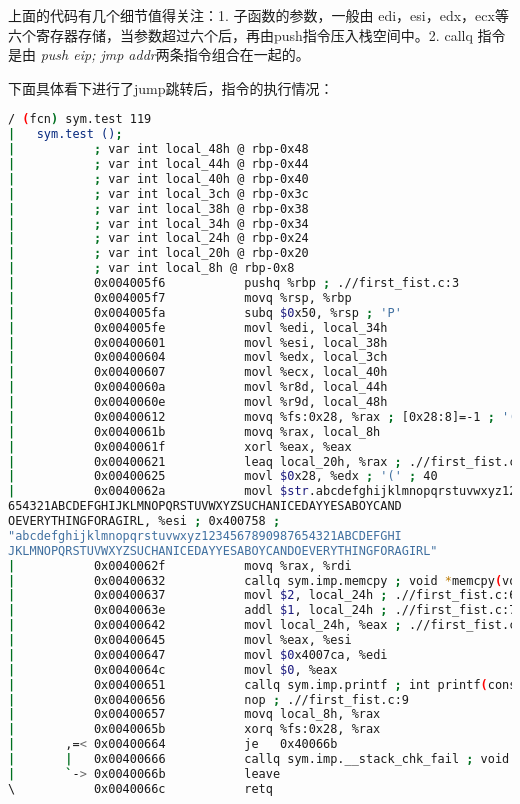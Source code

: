 \documentclass[12pt]{article}  %
\begin{document}
上面的代码有几个细节值得关注：1. 子函数的参数，一般由 edi，esi，edx，ecx等六个寄存器存储，当参数超过六个后，再由push指令压入栈空间中。2. callq 指令是由 \emph{push eip; jmp addr}两条指令组合在一起的。\par
下面具体看下进行了jump跳转后，指令的执行情况：\par
\begin{lstlisting}[language=sh]
/ (fcn) sym.test 119
|   sym.test ();
|           ; var int local_48h @ rbp-0x48
|           ; var int local_44h @ rbp-0x44
|           ; var int local_40h @ rbp-0x40
|           ; var int local_3ch @ rbp-0x3c
|           ; var int local_38h @ rbp-0x38
|           ; var int local_34h @ rbp-0x34
|           ; var int local_24h @ rbp-0x24
|           ; var int local_20h @ rbp-0x20
|           ; var int local_8h @ rbp-0x8
|           0x004005f6           pushq %rbp ; .//first_fist.c:3
|           0x004005f7           movq %rsp, %rbp
|           0x004005fa           subq $0x50, %rsp ; 'P'
|           0x004005fe           movl %edi, local_34h
|           0x00400601           movl %esi, local_38h
|           0x00400604           movl %edx, local_3ch
|           0x00400607           movl %ecx, local_40h
|           0x0040060a           movl %r8d, local_44h
|           0x0040060e           movl %r9d, local_48h
|           0x00400612           movq %fs:0x28, %rax ; [0x28:8]=-1 ; '(' ; 40
|           0x0040061b           movq %rax, local_8h
|           0x0040061f           xorl %eax, %eax
|           0x00400621           leaq local_20h, %rax ; .//first_fist.c:5
|           0x00400625           movl $0x28, %edx ; '(' ; 40
|           0x0040062a           movl $str.abcdefghijklmnopqrstuvwxyz1234567890987
654321ABCDEFGHIJKLMNOPQRSTUVWXYZSUCHANICEDAYYESABOYCAND
OEVERYTHINGFORAGIRL, %esi ; 0x400758 ; 
"abcdefghijklmnopqrstuvwxyz1234567890987654321ABCDEFGHI
JKLMNOPQRSTUVWXYZSUCHANICEDAYYESABOYCANDOEVERYTHINGFORAGIRL"
|           0x0040062f           movq %rax, %rdi
|           0x00400632           callq sym.imp.memcpy ; void *memcpy(void *s1, const void *s2, size_t n)
|           0x00400637           movl $2, local_24h ; .//first_fist.c:6
|           0x0040063e           addl $1, local_24h ; .//first_fist.c:7
|           0x00400642           movl local_24h, %eax ; .//first_fist.c:8
|           0x00400645           movl %eax, %esi
|           0x00400647           movl $0x4007ca, %edi
|           0x0040064c           movl $0, %eax
|           0x00400651           callq sym.imp.printf ; int printf(const char *format)
|           0x00400656           nop ; .//first_fist.c:9
|           0x00400657           movq local_8h, %rax
|           0x0040065b           xorq %fs:0x28, %rax
|       ,=< 0x00400664           je   0x40066b
|       |   0x00400666           callq sym.imp.__stack_chk_fail ; void __stack_chk_fail(void)
|       `-> 0x0040066b           leave
\           0x0040066c           retq

\end{lstlisting}\par
\end{document}
